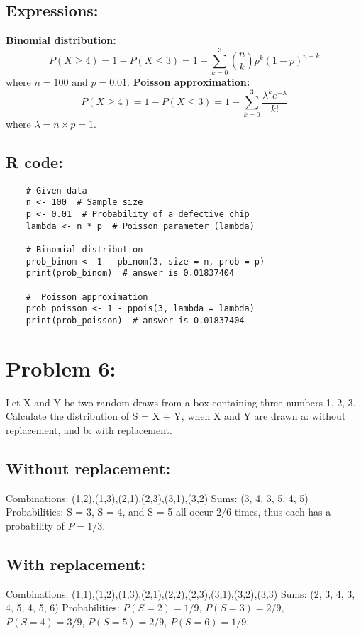 \documentclass{article}
\begin{document}
\subsection{Expressions:}
\textbf{Binomial distribution:}
\[
P(X \geq 4) = 1 - P(X \leq 3) = 1 - \sum_{k=0}^{3} \binom{n}{k} p^k (1-p)^{n-k}
\]
where \( n = 100 \) and \( p = 0.01 \).
\newline
\newline
\textbf{Poisson approximation:}
\[
P(X \geq 4) = 1 - P(X \leq 3) = 1 - \sum_{k=0}^{3} \frac{\lambda^k e^{-\lambda}}{k!}
\]
where \( \lambda = n \times p = 1 \).
\subsection{R code:}
\begin{lstlisting}
    # Given data
    n <- 100  # Sample size
    p <- 0.01  # Probability of a defective chip
    lambda <- n * p  # Poisson parameter (lambda)

    # Binomial distribution
    prob_binom <- 1 - pbinom(3, size = n, prob = p)
    print(prob_binom)  # answer is 0.01837404

    #  Poisson approximation
    prob_poisson <- 1 - ppois(3, lambda = lambda)
    print(prob_poisson)  # answer is 0.01837404
\end{lstlisting}

\section{Problem 6:}
Let X and Y be two random draws from a box containing three numbers {1, 2, 3}.
Calculate the distribution of S = X + Y, when X and Y are drawn a: without replacement,
and b: with replacement.
\subsection{Without replacement:}
Combinations: (1,2),(1,3),(2,1),(2,3),(3,1),(3,2)
\newline
Sums: (3, 4, 3, 5, 4, 5)
\newline
Probabilities: S = 3, S = 4, and S = 5 all occur $2/6$ times, thus each has a probability of $P = 1/3$.

\subsection{With replacement:}
Combinations: (1,1),(1,2),(1,3),(2,1),(2,2),(2,3),(3,1),(3,2),(3,3)
\newline
Sums: (2, 3, 4, 3, 4, 5, 4, 5, 6)
\newline
Probabilities: $P(S=2) = 1/9$, $P(S=3) = 2/9$, $P(S=4) = 3/9$, $P(S=5) = 2/9$, $P(S=6) = 1/9$.
\end{document}
